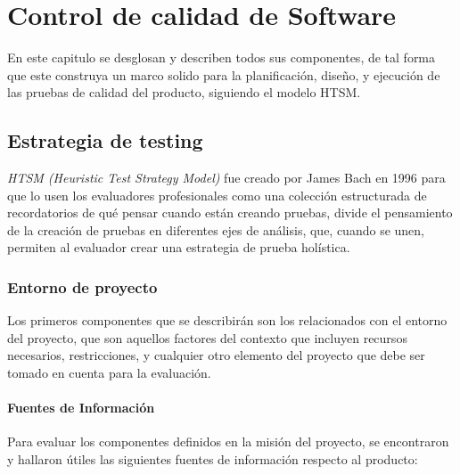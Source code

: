 \chapter{Control de calidad de Software}

En este capitulo se desglosan y describen todos sus componentes, de tal
forma que este construya un marco solido para la planificación, diseño, y
ejecución de las pruebas de calidad del producto, siguiendo el modelo HTSM.

\section{Estrategia de testing}

\emph{HTSM (Heuristic Test Strategy Model)} fue creado por James Bach en 1996
para que lo usen los evaluadores profesionales como una colección estructurada
de recordatorios de qué pensar cuando están creando pruebas, divide el
pensamiento de la creación de pruebas en diferentes ejes de análisis, que,
cuando se unen, permiten al evaluador crear una estrategia de prueba
holística\cite{Bach}.

\subsection{Entorno de proyecto}
Los primeros componentes que se describirán son los relacionados con el entorno
del proyecto, que son aquellos factores del contexto que incluyen recursos
necesarios, restricciones, y cualquier otro elemento del proyecto que debe ser
tomado en cuenta para la evaluación.

\subsubsection{Fuentes de Información}
Para evaluar los componentes definidos en la misión del proyecto, se encontraron
y hallaron útiles las siguientes fuentes de información respecto al producto:

